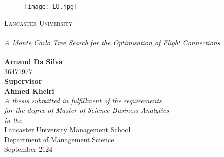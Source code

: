 \begin{titlepage}
    \begin{center}

        \begin{figure}[htbp]
            \centering
            \texttt{[image: LU.jpg]}
        \end{figure}

        \textsc{\LARGE Lancaster University}\\[0.7cm]
        \HRule \\[0.7cm]
        {\huge \textit{A Monte Carlo Tree Search for the Optimisation of Flight Connections}}\\[0.4cm]
        \HRule \\[0.7cm]
        {\LARGE \bfseries Arnaud Da Silva}\\[0.4cm]
        {\LARGE  36471977}\\[1cm]
        {\large  \bfseries Supervisor }\\[0.4cm]
        {\large \bfseries Ahmed Kheiri}\\[1cm]
        \large \textit{A thesis submitted in fulfillment of the requirements\\ for the degree of Master of Science Business Analytics}\\[0.3cm] %
        \textit{in the}\\[0.4cm]
        Lancaster University Management School \\
        Department of Management Science\\[1cm] %
        {\large September 2024}\\[4cm]
        \vfill
    \end{center}
\end{titlepage}
